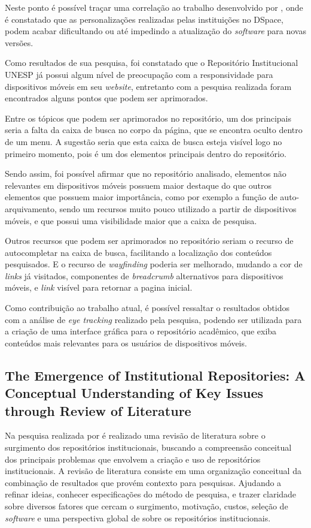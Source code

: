 Neste ponto é possível traçar uma correlação ao trabalho desenvolvido por
\cite{2019:RodrigoMoreira}, onde é constatado que as
personalizações realizadas pelas instituições no DSpace,
podem acabar dificultando ou até impedindo a atualização do
\emph{software} para novas versões.

Como resultados de sua pesquisa, foi constatado que o Repositório
Institucional UNESP já possui algum nível de preocupação com a
responsividade para dispositivos móveis em seu \emph{website},
entretanto com a pesquisa realizada foram encontrados alguns
pontos que podem ser aprimorados.

Entre os tópicos que podem ser aprimorados no repositório,
um dos principais seria a falta da caixa de busca no corpo
da página, que se encontra oculto dentro de um menu. A sugestão
seria que esta caixa de busca esteja visível logo no primeiro
momento, pois é um dos elementos principais dentro do repositório.

Sendo assim, foi possível afirmar que no repositório analisado,
elementos não relevantes em dispositivos móveis possuem maior destaque
do que outros elementos que possuem maior importância,
como por exemplo a função de auto-arquivamento,
sendo um recursos muito pouco utilizado a partir de dispositivos móveis,
e que possui uma visibilidade maior que a caixa de pesquisa.

Outros recursos que podem ser aprimorados no repositório seriam
o recurso de autocompletar na caixa de busca, facilitando a localização
dos conteúdos pesquisados. E o recurso de \emph{wayfinding} poderia ser
melhorado, mudando a cor de \emph{links} já visitados, componentes
de \emph{breadcrumb} alternativos para dispositivos móveis, e
\emph{link} visível para retornar a pagina inicial.

Como contribuição ao trabalho atual, é possível ressaltar o resultados
obtidos com a análise de \emph{eye tracking} realizado pela pesquisa,
podendo ser utilizada para a criação de uma interface gráfica para
o repositório acadêmico, que exiba conteúdos mais relevantes para
os usuários de dispositivos móveis.

\subsection{The Emergence of Institutional Repositories: A Conceptual Understanding of Key Issues through Review of Literature}

Na pesquisa realizada por \cite{2018:Saini} é realizado uma revisão de
literatura sobre o surgimento dos repositórios institucionais,
buscando a compreensão conceitual dos principais problemas que envolvem
a criação e uso de repositórios institucionais. A revisão de literatura
consiste em uma organização conceitual da combinação de resultados que provém
contexto para pesquisas. Ajudando a refinar ideias, conhecer especificações do
método de pesquisa, e trazer claridade sobre diversos fatores que cercam o
surgimento, motivação, custos, seleção de \emph{software} e uma perspectiva global
de sobre os repositórios institucionais.

